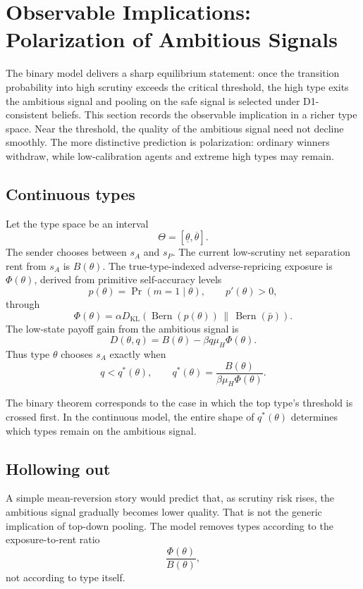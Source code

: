 
\section{Observable Implications: Polarization of Ambitious Signals}
\label{sec:polarization}

The binary model delivers a sharp equilibrium statement: once the transition probability into high scrutiny exceeds the critical threshold, the high type exits the ambitious signal and pooling on the safe signal is selected under D1-consistent beliefs. This section records the observable implication in a richer type space. Near the threshold, the quality of the ambitious signal need not decline smoothly. The more distinctive prediction is polarization: ordinary winners withdraw, while low-calibration agents and extreme high types may remain.

\subsection{Continuous types}

Let the type space be an interval
\[
\Theta=[\underline\theta,\overline\theta].
\]
The sender chooses between \(s_A\) and \(s_P\). The current low-scrutiny net separation rent from \(s_A\) is \(B(\theta)\). The true-type-indexed adverse-repricing exposure is \(\Phi(\theta)\), derived from primitive self-accuracy levels
\[
p(\theta)=\Pr(m=1\mid \theta),
\qquad
p'(\theta)>0,
\]
through
\[
\Phi(\theta)=
\alpha D_{\mathrm{KL}}
\left(
\operatorname{Bern}(p(\theta))
\,\middle\|\,
\operatorname{Bern}(\bar p)
\right).
\]
The low-state payoff gain from the ambitious signal is
\[
D(\theta,q)=B(\theta)-\beta q\mu_H\Phi(\theta).
\]
Thus type \(\theta\) chooses \(s_A\) exactly when
\[
q<q^*(\theta),
\qquad
q^*(\theta)=\frac{B(\theta)}{\beta\mu_H\Phi(\theta)}.
\]

The binary theorem corresponds to the case in which the top type's threshold is crossed first. In the continuous model, the entire shape of \(q^*(\theta)\) determines which types remain on the ambitious signal.

\subsection{Hollowing out}

A simple mean-reversion story would predict that, as scrutiny risk rises, the ambitious signal gradually becomes lower quality. That is not the generic implication of top-down pooling. The model removes types according to the exposure-to-rent ratio
\[
\frac{\Phi(\theta)}{B(\theta)},
\]
not according to type itself.

